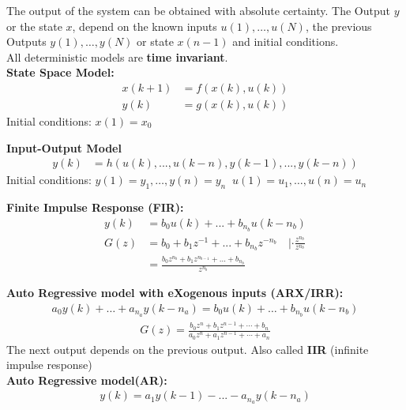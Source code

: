 \begin{tcolorbox}[colback=green!5!white,colframe=green!75!black,title=\textbf{Deterministic Model}]
  The output of the system can be obtained with absolute certainty. The Output $y$ or the state $x$, depend on the known inputs $u(1), \dots, u(N)$, the previous Outputs $y(1), \dots, y(N)$ or state $x(n-1)$ and initial conditions. \\
  All deterministic models are \textbf{time invariant}.\\
\textbf{State Space Model: }
\begin{align*}
	 x(k+1) &= f(x(k), u(k)) \\
	y(k) &= g(x(k), u(k)) 
\end{align*}
Initial conditions: $x(1) = x_0$

\textbf{Input-Output Model}
\begin{align*}
y(k) &= h(u(k), ..., u(k-n), y(k-1), ..., y(k-n))
\end{align*}
Initial conditions: $y(1) = y_1,\dots,y(n) = y_n  \;\; u(1)= u_1,\dots,u(n) = u_n$

\textbf{Finite Impulse Response (FIR): } 
\begin{align*}
	y(k) &= b_0 u(k) + ... + b_{n_b} u(k-n_b) \\
	G(z) &= b_0 + b_1z^{-1} + ... + b_{n_b}z^{-n_b} \quad | \cdot \frac{z^{n_b}}{z^{n_b}} \\
	&= \frac{b_0 z^{n_b} + b_1 z^{ n_{b-1} } + ... + b_{n_b} }{z^{n_b}}
\end{align*}

\textbf{Auto Regressive model with eXogenous inputs (ARX/IRR):}
\begin{align*}
	a_0y(k)+\dots+a_{n_a}y(k-n_a) = b_0u(k) + \dots+b_{n_b}u(k-n_b)
\end{align*}
\begin{align*}
G(z) = \frac{b_0z^n + b_1z^{n-1} + \cdots + b_n}{a_0z^n + a_1z^{n-1} + \cdots + a_n}
\end{align*}
The next output depends on the previous output. Also called \textbf{IIR} (infinite impulse response)\\

\textbf{Auto Regressive model(AR):}
\begin{align*}
	y(k)= a_1y(k-1)-...-a_{n_a}y(k-n_a)
\end{align*}


\end{tcolorbox}		
